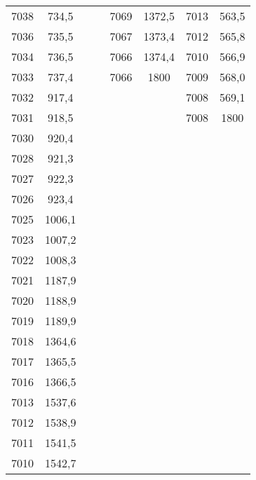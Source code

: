 \documentclass[11pt]{article}
\begin{document}
{{\begin{tabular}{|c|c|cccccc}
            7038 & 734,5 &  & \multicolumn{1}{c|}{} & \multicolumn{1}{c|}{7069} & \multicolumn{1}{c|}{1372,5} & \multicolumn{1}{c|}{7013} & \multicolumn{1}{c|}{563,5}\tabularnewline
            \cline{1-2} \cline{5-8} 
            7036 & 735,5 &  & \multicolumn{1}{c|}{} & \multicolumn{1}{c|}{7067} & \multicolumn{1}{c|}{1373,4} & \multicolumn{1}{c|}{7012} & \multicolumn{1}{c|}{565,8}\tabularnewline
            \cline{1-2} \cline{5-8} 
            7034 & 736,5 &  & \multicolumn{1}{c|}{} & \multicolumn{1}{c|}{7066} & \multicolumn{1}{c|}{1374,4} & \multicolumn{1}{c|}{7010} & \multicolumn{1}{c|}{566,9}\tabularnewline
            \cline{1-2} \cline{5-8} 
            7033 & 737,4 &  & \multicolumn{1}{c|}{} & \multicolumn{1}{c|}{7066} & \multicolumn{1}{c|}{1800} & \multicolumn{1}{c|}{7009} & \multicolumn{1}{c|}{568,0}\tabularnewline
            \cline{1-2} \cline{5-8} 
            7032 & 917,4 &  &  &  & \multicolumn{1}{c|}{} & \multicolumn{1}{c|}{7008} & \multicolumn{1}{c|}{569,1}\tabularnewline
            \cline{1-2} \cline{7-8} 
            7031 & 918,5 &  &  &  & \multicolumn{1}{c|}{} & \multicolumn{1}{c|}{7008} & \multicolumn{1}{c|}{1800}\tabularnewline
            \cline{1-2} \cline{7-8} 
            7030 & 920,4 &  &  &  &  &  & \tabularnewline
            \cline{1-2} 
            7028 & 921,3 &  &  &  &  &  & \tabularnewline
            \cline{1-2} 
            7027 & 922,3 &  &  &  &  &  & \tabularnewline
            \cline{1-2} 
            7026 & 923,4 &  &  &  &  &  & \tabularnewline
            \cline{1-2} 
            7025 & 1006,1 &  &  &  &  &  & \tabularnewline
            \cline{1-2} 
            7023 & 1007,2 &  &  &  &  &  & \tabularnewline
            \cline{1-2} 
            7022 & 1008,3 &  &  &  &  &  & \tabularnewline
            \cline{1-2} 
            7021 & 1187,9 &  &  &  &  &  & \tabularnewline
            \cline{1-2} 
            7020 & 1188,9 &  &  &  &  &  & \tabularnewline
            \cline{1-2} 
            7019 & 1189,9 &  &  &  &  &  & \tabularnewline
            \cline{1-2} 
            7018 & 1364,6 &  &  &  &  &  & \tabularnewline
            \cline{1-2} 
            7017 & 1365,5 &  &  &  &  &  & \tabularnewline
            \cline{1-2} 
            7016 & 1366,5 &  &  &  &  &  & \tabularnewline
            \cline{1-2} 
            7013 & 1537,6 &  &  &  &  &  & \tabularnewline
            \cline{1-2} 
            7012 & 1538,9 &  &  &  &  &  & \tabularnewline
            \cline{1-2} 
            7011 & 1541,5 &  &  &  &  &  & \tabularnewline
            \cline{1-2} 
            7010 & 1542,7 &  &  &  &  &  & \tabularnewline

\end{tabular}}}
\end{document}

